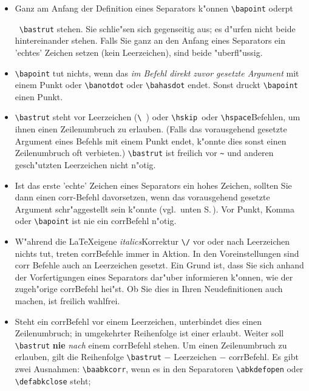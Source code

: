 \documentclass[12pt,a4paper]{article}
\newcommand{\pdfko}[1]{\kern #1pt
                          \strut\ignorespaces}%
\begin{document}
\begin{itemize}
\item Ganz am Anfang der Definition eines Separators k"onnen \verb|\bapoint|
      oder\pdfko{1.5}\ 
      \verb|\bastrut| stehen. Sie schlie"sen sich gegenseitig aus; es
      d"urfen nicht beide hintereinander stehen. Falls Sie ganz an den
      Anfang eines Separators ein 'echtes' Zeichen setzen (kein
      Leerzeichen), sind beide "uberfl"ussig.
\item \verb|\bapoint| tut nichts, wenn das \textit{im \BibArts\hy Befehl
      direkt zuvor gesetzte Argument} mit einem Punkt oder \verb|\banotdot|
      oder \verb|\bahasdot| endet. Sonst druckt \verb|\bapoint| einen Punkt.
\item \verb|\bastrut| steht vor Leerzeichen (\verb*|\ |) oder
      \verb|\hskip|\hy\ oder \verb|\hspace|\hy Befehlen, um ihnen einen
      Zeilenumbruch zu erlauben. (Falls das vorausgehend gesetzte Argument
      eines \BibArts\hy Befehls mit einem Punkt endet, k"onnte dies sonst
      einen Zeilenumbruch oft verbieten.) \verb|\bastrut| ist freilich vor
      \verb|~| und anderen gesch"utzten Leerzeichen nicht n"otig.
\item Ist das erste 'echte' Zeichen eines Separators ein hohes Zeichen,
      sollten Sie dann einen corr-Befehl davorsetzen, wenn das vorausgehend
      gesetzte Argument schr"aggestellt sein k"onnte (vgl.\ unten S.\,\pageref{hervor}). 
      Vor Punkt, Komma oder \verb|\bapoint| ist nie ein corr\hy Befehl n"otig. 
\item W"ahrend die \LaTeX\hy eigene \textit{italics}\hy Korrektur \verb|\/|
      vor oder nach Leerzeichen nichts tut, treten \BibArts\hy
      corr\hy Befehle immer in Aktion. In den Voreinstellungen sind corr\hy
      Befehle auch an Leerzeichen gesetzt. Ein Grund ist, dass Sie sich
      anhand der Vorfertigungen eines Separators dar"uber informieren
      k"onnen, wie der zugeh"orige corr\hy Befehl hei"st. Ob Sie dies in
      Ihren Neudefinitionen auch machen, ist freilich wahlfrei.
\item Steht ein corr\hy Befehl vor einem Leerzeichen, unterbindet dies einen 
      Zeilenumbruch; in umgekehrter Reihenfolge ist einer erlaubt. Weiter
      soll \verb|\bastrut| \textbf{nie} \textit{nach} einem corr\hy Befehl
      stehen. Um einen Zeilenumbruch zu erlauben, gilt die Reihenfolge
      \verb|\bastrut| $-$ Leerzeichen $-$ corr\hy Befehl. Es gibt zwei
      Ausnahmen: \verb|\baabkcorr|, wenn es in den Separatoren
      \verb|\abkdefopen| oder \verb|\defabkclose| steht; 

\end{itemize}
\end{document}
